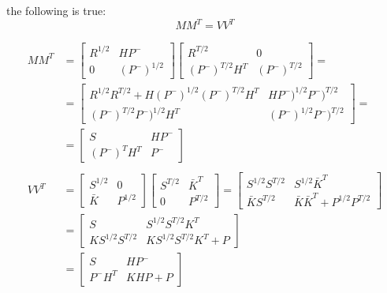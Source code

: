 \documentclass{article}
\begin{document}
the following is true:
\begin{equation}\label{update_SR_mult}
    MM^T = VV^T
\end{equation}

\begin{equation}
\begin{split}
    MM^T &= \begin{bmatrix} R^{1/2} & HP^- \\ 0 & (P^-)^{1/2} \end{bmatrix}\begin{bmatrix} R^{T/2} & 0 \\ (P^-)^{T/2}H^T & (P^-)^{T/2} \end{bmatrix}= \\
    &=\begin{bmatrix} R^{1/2}R^{T/2} + H(P^-)^{1/2}(P^-)^{T/2}H^T & HP^-)^{1/2}P^-)^{T/2} \\ (P^-)^{T/2}P^-)^{1/2}H^T & (P^-)^{1/2}P^-)^{T/2} \end{bmatrix} = \\
    &=\begin{bmatrix}S & HP^- \\ (P^-)^TH^T & P^- \end{bmatrix} \\
    \\
    VV^T & = \begin{bmatrix} S^{1/2} & 0 \\ \bar{K} & P^{1/2} \end{bmatrix}\begin{bmatrix} S^{T/2} & \bar{K}^T \\ 0 & P^{T/2} \end{bmatrix} = \begin{bmatrix} S^{1/2}S^{T/2} & S^{1/2}\bar{K}^T \\ \bar{K}S^{T/2} & \bar{K}\bar{K}^T + P^{1/2}P^{T/2} \end{bmatrix}\\
     & = \begin{bmatrix} S & S^{1/2}S^{T/2}K^T \\ KS^{1/2}S^{T/2} & KS^{1/2}S^{T/2}K^T + P\end{bmatrix} \\
     & = \begin{bmatrix} S & HP^- \\ P^-H^T & KHP + P\end{bmatrix}
\end{split}
\end{equation}
\end{document}
